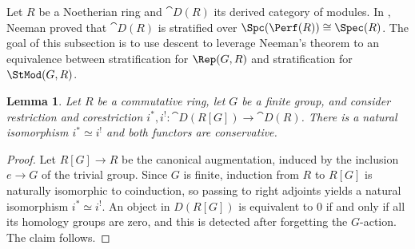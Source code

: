 \documentclass{amsart}%
\numberwithin{equation}{section}%
\newtheorem{Lem}[equation]{Lemma}
\theoremstyle{remark}
\begin{document}
Let $R$ be a Noetherian ring and $\cat D(R)$ its derived category of modules. In \cite{Neeman92a}, Neeman proved that $\cat D(R)$ is stratified over $\Spc(\Perf(R)) \cong \Spec(R)$. The goal of this subsection is to use descent to leverage Neeman's theorem to an equivalence between stratification for $\Rep(G,R)$ and stratification for $\StMod(G,R)$.

\begin{Lem}\label{lem:deraugconservative}
Let $R$ be a commutative ring, let $G$ be a finite group, and consider restriction and corestriction $i^*, i^!\colon \cat D(R[G]) \to \cat D(R)$. There is a natural isomorphism $i^* \simeq i^!$ and both functors are conservative.
\end{Lem}
\begin{proof}
Let $R[G] \to R$ be the canonical augmentation, induced by the inclusion $e \to G$ of the trivial group. Since $G$ is finite, induction from $R$ to $R[G]$ is naturally isomorphic to coinduction, so passing to right adjoints yields a natural isomorphism $i^* \simeq i^!$. An object in $D(R[G])$ is equivalent to $0$ if and only if all its homology groups are zero, and this is detected after forgetting the $G$-action. The claim follows.
\end{proof}
\end{document}
